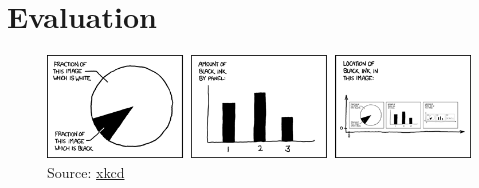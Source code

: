 \chapter{Evaluation}
\label{cha:evaluation}

\begin{figure}[h]
    \centering
    \includegraphics[width=\textwidth]{gfx/xkcd/688.png}
    \caption*{Source: \href{https://xkcd.com/688/}{xkcd}}
\end{figure}


